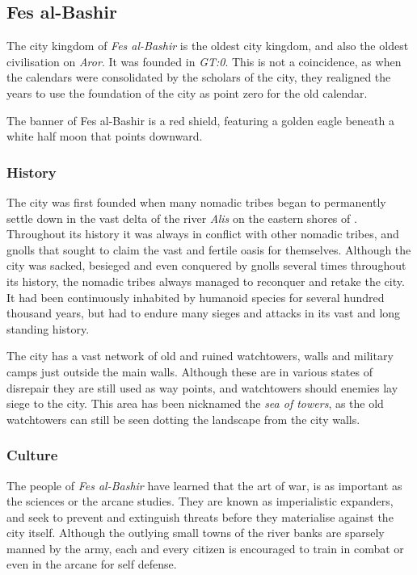 \subsection{Fes al-Bashir}
\label{sec:Fes al-Bashir}

The city kingdom of \emph{Fes al-Bashir} is the oldest city kingdom, and also
the oldest civilisation on \emph{Aror}. It was founded in \emph{GT:0}. This is
not a coincidence, as when the calendars were consolidated by the scholars of
the city, they realigned the years to use the foundation of the city as point
zero for the old calendar.

The banner of Fes al-Bashir is a red shield, featuring a golden eagle beneath
a white half moon that points downward.

\subsubsection{History}

The city was first founded when many nomadic tribes began to permanently
settle down in the vast delta of the river \emph{Alis} on the eastern shores
of . Throughout its history it was always in conflict with
other nomadic tribes, and gnolls that sought to claim the vast and fertile
oasis for themselves. Although the city was sacked, besieged and even
conquered by gnolls several times throughout its history, the nomadic tribes
always managed to reconquer and retake the city. It had been continuously
inhabited by humanoid species for several hundred thousand years, but had to
endure many sieges and attacks in its vast and long standing history.

The city has a vast network of old and ruined watchtowers, walls and military
camps just outside the main walls. Although these are in various states of
disrepair they are still used as way points, and watchtowers should enemies
lay siege to the city. This area has been nicknamed the \emph{sea of towers},
as the old watchtowers can still be seen dotting the landscape from the city
walls.

\subsubsection{Culture}

The people of \emph{Fes al-Bashir} have learned that the art of war, is as
important as the sciences or the arcane studies. They are known as
imperialistic expanders, and seek to prevent and extinguish threats before
they materialise against the city itself. Although the outlying small towns of
the river banks are sparsely manned by the army, each and every citizen is
encouraged to train in combat or even in the arcane for self defense.

